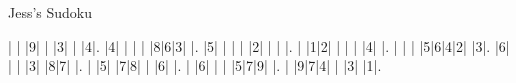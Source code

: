 Jess's Sudoku\vspace{0.2cm}

\begin{sudoku-block}| | |9| | |3| | |4|.
|4| | | | |8|6|3| |.
|5| | | | |2| | | |.
| |1|2| | | | |4| |.
| | | |5|6|4|2| |3|.
|6| | | |3| |8|7| |.
| |5| |7|8| | |6| |.
| |6| | | |5|7|9| |.
| |9|7|4| | |3| |1|.
\end{sudoku-block}
